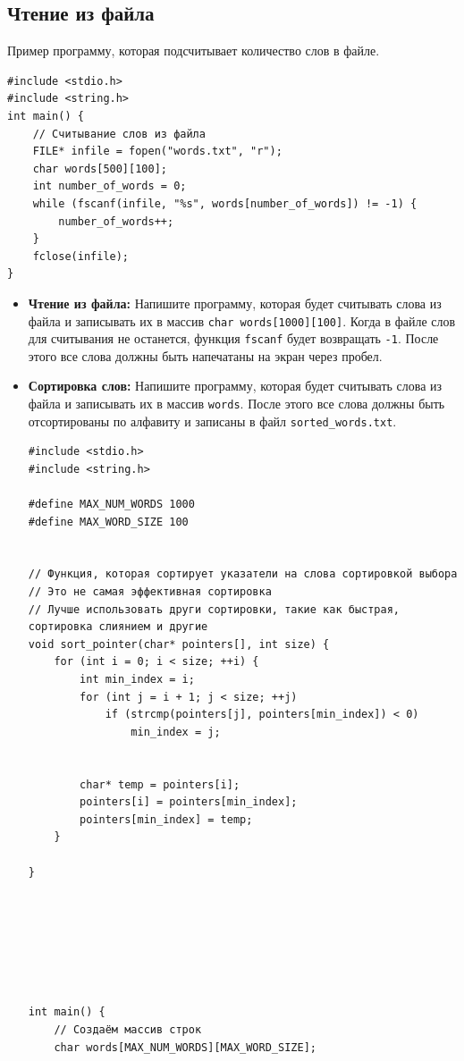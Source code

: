 \documentclass{article}
\begin{document}
\subsection*{Чтение из файла}
Пример программу, которая подсчитывает количество слов в файле.
\begin{lstlisting}
#include <stdio.h>
#include <string.h>
int main() {
	// Считывание слов из файла
	FILE* infile = fopen("words.txt", "r");
	char words[500][100];
	int number_of_words = 0;
	while (fscanf(infile, "%s", words[number_of_words]) != -1) {
		number_of_words++;
	}
	fclose(infile);
}
\end{lstlisting}
\begin{itemize}
\item \textbf{Чтение из файла:} Напишите программу, которая будет считывать слова из файла и записывать их в массив \texttt{char words[1000][100]}. Когда в файле слов для считывания не останется, функция \texttt{fscanf} будет возвращать \texttt{-1}. После этого все слова должны быть напечатаны на экран через пробел. 
\item \textbf{Сортировка слов:} Напишите программу, которая будет считывать слова из файла и записывать их в массив \texttt{words}. После этого все слова должны быть отсортированы по алфавиту и записаны в файл \texttt{sorted\_words.txt}.

\begin{lstlisting}[backgroundcolor = \color{solcolor}]
#include <stdio.h>
#include <string.h>

#define MAX_NUM_WORDS 1000
#define MAX_WORD_SIZE 100


// Функция, которая сортирует указатели на слова сортировкой выбора
// Это не самая эффективная сортировка
// Лучше использовать други сортировки, такие как быстрая, сортировка слиянием и другие
void sort_pointer(char* pointers[], int size) {
    for (int i = 0; i < size; ++i) {
        int min_index = i;
        for (int j = i + 1; j < size; ++j)
            if (strcmp(pointers[j], pointers[min_index]) < 0)
                min_index = j;
                
        
        char* temp = pointers[i];
        pointers[i] = pointers[min_index];
        pointers[min_index] = temp;
    }
    
}







int main() {
    // Создаём массив строк
    char words[MAX_NUM_WORDS][MAX_WORD_SIZE];
    

\end{lstlisting}
\end{itemize}
\end{document}
